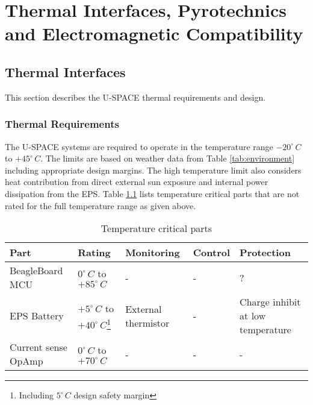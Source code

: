 \chapter{Thermal Interfaces, Pyrotechnics and Electromagnetic Compatibility}
\label{chap:thermal_pyro_emc}

\section{Thermal Interfaces}
This section describes the \ac{U-SPACE} thermal requirements and design.
%
\subsection{Thermal Requirements}
The \ac{U-SPACE} systems are required to operate in the temperature range $-20^{\circ}\,C$ to $+45^{\circ}\,C$. The limits are based on weather data from Table \ref{tab:environment} including appropriate design margins. The high temperature limit also considers heat contribution from direct external sun exposure and internal power dissipation from the \ac{EPS}. Table \ref{tab:temp_critical_parts} lists temperature critical parts that are not rated for the full temperature range as given above.
%
\begin{table}[H]
\centering
\caption{Temperature critical parts}
\label{tab:temp_critical_parts}
\begin{minipage}{\textwidth}
\begin{tabular}{p{}p{}p{}p{}p{}}
\hline
\textbf{Part} & \textbf{Rating} & \textbf{Monitoring} & \textbf{Control} & \textbf{Protection}\\
\hline
BeagleBoard \ac{MCU} & $0^{\circ}\,C$ to $+85^{\circ}\,C$ & - & - & ?\\
\hline
\ac{EPS} Battery &  $+5^{\circ}\,C$ to $+40^{\circ}\,C$\footnote{Including $5^{\circ}\,C$ design safety margin} & External thermistor & - & Charge inhibit at low temperature\\
\hline
Current sense OpAmp & $0^{\circ}\,C$ to $+70^{\circ}\,C$ & - & - & -\\
\hline
\end{tabular}\par
\vspace{-0.75\skip\footins}
\renewcommand{\footnoterule}{}
\end{minipage}
\end{table}

